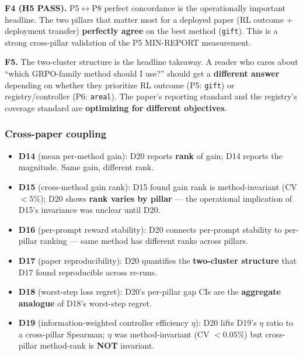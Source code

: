 \documentclass{article}
\begin{document}
\textbf{F4 (H5 PASS).}
P5$\leftrightarrow$P8 perfect concordance is the operationally important
headline. The two pillars that matter most for a deployed paper (RL
outcome + deployment transfer) \textbf{perfectly agree} on the best
method (\texttt{gift}). This is a strong cross-pillar validation of
the P5 MIN-REPORT measurement.

\textbf{F5.}
The two-cluster structure is the headline takeaway. A reader who cares
about ``which GRPO-family method should I use?'' should get a
\textbf{different answer} depending on whether they prioritize RL outcome
(P5: \texttt{gift}) or registry/controller (P6: \texttt{areal}).
The paper's reporting standard and the registry's coverage standard are
\textbf{optimizing for different objectives}.

\subsubsection{Cross-paper coupling}\label{sec:synth-iter192-d20-coupling}

\begin{itemize}
\item \textbf{D14} (mean per-method gain): D20 reports \textbf{rank} of
  gain; D14 reports the magnitude. Same gain, different rank.
\item \textbf{D15} (cross-method gain rank): D15 found gain rank is
  method-invariant (CV $< 5\%$); D20 shows \textbf{rank varies by
  pillar} --- the operational implication of D15's invariance was
  unclear until D20.
\item \textbf{D16} (per-prompt reward stability): D20 connects per-prompt
  stability to per-pillar ranking --- same method has different ranks
  across pillars.
\item \textbf{D17} (paper reproducibility): D20 quantifies the
  \textbf{two-cluster structure} that D17 found reproducible across re-runs.
\item \textbf{D18} (worst-step loss regret): D20's per-pillar gap CIs are
  the \textbf{aggregate analogue} of D18's worst-step regret.
\item \textbf{D19} (information-weighted controller efficiency $\eta$):
  D20 lifts D19's $\eta$ ratio to a cross-pillar Spearman; $\eta$ was
  method-invariant (CV $< 0.05\%$) but cross-pillar method-rank is
  \textbf{NOT} invariant.
\end{itemize}
\end{document}
